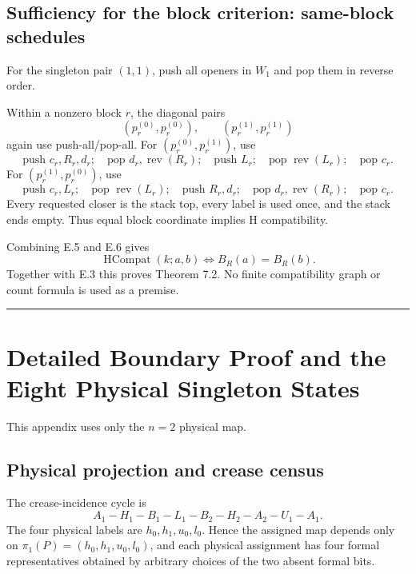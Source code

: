 \documentclass[11pt]{article}
\theoremstyle{definition}
\theoremstyle{remark}
\begin{document}
\subsection{Sufficiency for the block criterion: same-block
schedules}\label{e.6.-sufficiency-for-the-block-criterion-same-block-schedules}

For the singleton pair \((1,1)\), push all openers in \(W_1\) and pop
them in reverse order.

Within a nonzero block \(r\), the diagonal pairs \[
(p_r^{(0)},p_r^{(0)}),
\qquad
(p_r^{(1)},p_r^{(1)})
\] again use push-all/pop-all. For \((p_r^{(0)},p_r^{(1)})\), use \[
\text{push }c_r,R_r,d_r;\quad
\text{pop }d_r,\operatorname{rev}(R_r);\quad
\text{push }L_r;\quad
\text{pop }\operatorname{rev}(L_r);\quad
\text{pop }c_r.
\] For \((p_r^{(1)},p_r^{(0)})\), use \[
\text{push }c_r,L_r;\quad
\text{pop }\operatorname{rev}(L_r);\quad
\text{push }R_r,d_r;\quad
\text{pop }d_r,\operatorname{rev}(R_r);\quad
\text{pop }c_r.
\] Every requested closer is the stack top, every label is used once,
and the stack ends empty. Thus equal block coordinate implies H
compatibility.

Combining E.5 and E.6 gives \[
\operatorname{HCompat}(k;a,b)
\iff
B_R(a)=B_R(b).
\] Together with E.3 this proves Theorem 7.2. No finite compatibility
graph or count formula is used as a premise.

\begin{center}\rule{0.5\linewidth}{0.5pt}\end{center}

\section{Detailed Boundary Proof and the Eight Physical Singleton States}\label{appendix-f.-detailed-boundary-proof-and-the-eight-physical-singleton-states}

This appendix uses only the \(n=2\) physical map.

\subsection{Physical projection and crease
census}\label{f.1.-physical-projection-and-crease-census}

The crease-incidence cycle is \[
A_1-H_1-B_1-L_1-B_2-H_2-A_2-U_1-A_1.
\] The four physical labels are \(h_0,h_1,u_0,l_0\). Hence the assigned
map depends only on \(\pi_1(P)=(h_0,h_1,u_0,l_0)\), and each physical
assignment has four formal representatives obtained by arbitrary choices
of the two absent formal bits.
\end{document}
